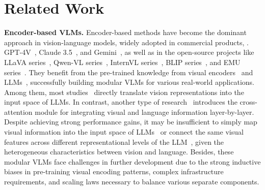 \section{Related Work}
\label{sec:Related-work}

\textbf{Encoder-based VLMs.} 
Encoder-based methods have become the dominant approach in vision-language models, widely adopted in commercial products, \eg. GPT-4V~\cite{VLM:GPT-4}, Claude 3.5~\cite{VLM:Claude3}, and Gemini~\cite{VLM:Gemini}, as well as in the open-source projects like LLaVA series~\cite{VLM:LLaVA, VLM:LLaVA-1.5, VLM:LLaVA-1.6, Llava-onevision}, Qwen-VL series~\cite{VLM:qwen-vl,wang2024qwen2-vl}, InternVL series~\cite{VLM:InternVL, VLM:InternVL-1.5}, BLIP series~\cite{VLP:BLIP,VLP:BLIPv2,xue2024blip-3}, and EMU series~\cite{VLM:EMU,VLM:EMUv2}. They benefit from the pre-trained knowledge from visual encoders~\cite{VLP:CLIP,TransF:Siglip,TransF:EVA-CLIP,CL:DINO} and LLMs~\cite{TransF:LLaMA,TransF:LLaMA2,TransF:Vicuna,TransF:InternLM,TransF:InternLM2,TransF:Qwen,yang2024qwen2,qwen2.5}, successfully building modular VLMs for various real-world applications. Among them, most studies~\cite{VLM:mPLUG-Owl,VLM:mPLUG-Owl2,VLM:Monkey,VLM:LLaVA-UHD,VLM:Sharegpt4v,VLM:Densefusion} directly translate vision representations into the input space of LLMs.
%
In contrast, another type of research~\cite{VLM:Llama-Adapter,VLM:Llama-Adapterv2,VLM:CogAgent,VLP:Flamingo,VLMs:LLama3.2} introduces the cross-attention module for integrating visual and language information layer-by-layer.
%
Despite achieving strong performance gains, it may be insufficient to simply map visual information into the input space of LLMs~\cite{VLM:LLaVA-1.5,VLM:mPLUG-Owl2} or connect the same visual features across different representational levels of the LLM~\cite{VLM:CogAgent,VLM:IDEFICS}, given the heterogeneous characteristics between vision and language. 
%
Besides, these modular VLMs face challenges in further development due to the strong inductive biases in pre-training visual encoding patterns, complex infrastructure requirements, and scaling laws necessary to balance various separate components.



